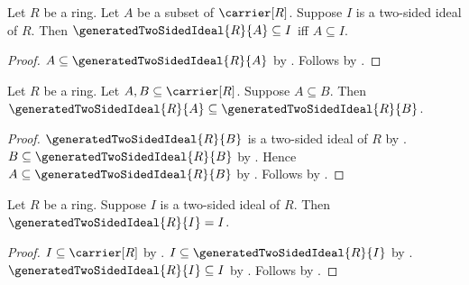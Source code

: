 \begin{theorem}\label{generated_two_sided_ideal_universal_property}
    Let $R$ be a ring.
    Let $A$ be a subset of $\carrier[R]$.
    Suppose $I$ is a two-sided ideal of $R$.
    Then $\generatedTwoSidedIdeal{R}{A}\subseteq I$ iff $A\subseteq I$.
\end{theorem}
\begin{proof}
    $A\subseteq\generatedTwoSidedIdeal{R}{A}$ by
        .
    Follows by
        .
\end{proof}

\begin{proposition}\label{generated_two_sided_ideal_monotone}
    Let $R$ be a ring.
    Let $A,B\subseteq\carrier[R]$.
    Suppose $A\subseteq B$.
    Then $\generatedTwoSidedIdeal{R}{A}\subseteq
        \generatedTwoSidedIdeal{R}{B}$.
\end{proposition}
\begin{proof}
    $\generatedTwoSidedIdeal{R}{B}$ is a two-sided ideal of $R$ by
        .
    $B\subseteq\generatedTwoSidedIdeal{R}{B}$ by
        .
    Hence $A\subseteq\generatedTwoSidedIdeal{R}{B}$ by
        .
    Follows by .
\end{proof}

\begin{corollary}\label{generated_two_sided_ideal_of_two_sided_ideal}
    Let $R$ be a ring.
    Suppose $I$ is a two-sided ideal of $R$.
    Then $\generatedTwoSidedIdeal{R}{I}=I$.
\end{corollary}
\begin{proof}
    $I\subseteq\carrier[R]$ by
        .
    $I\subseteq\generatedTwoSidedIdeal{R}{I}$ by
        .
    $\generatedTwoSidedIdeal{R}{I}\subseteq I$ by
        .
    Follows by .
\end{proof}

